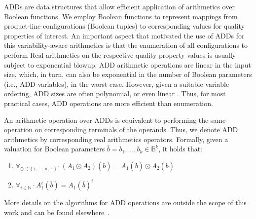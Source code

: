 ADDs are data structures that allow efficient application of arithmetics over Boolean functions.
We employ Boolean functions to represent mappings from product-line
configurations (Boolean tuples) to corresponding values for quality properties of interest.
An important aspect that motivated the use of ADDs for this
variability-aware arithmetics is that the enumeration of all configurations to perform Real
arithmetics on the respective quality property values is usually subject to exponential blowup.
ADD arithmetic operations are linear in the input size, which, in turn,
can also be exponential in the number of Boolean parameters (i.e., ADD variables), in the worst case.
However, given a suitable variable ordering, ADD sizes are often polynomial, or even linear \citep{ADD}.
Thus, for most practical cases, ADD operations are more efficient than enumeration.

An arithmetic operation over ADDs is equivalent to performing
the same operation on corresponding terminals of the operands.
Thus, we denote ADD arithmetics by corresponding real arithmetics operators.
Formally, given a valuation for Boolean parameters $\bar{b} = b_1,\dotsc,b_k \in \mathbb{B}^k$, it holds that:
\begin{enumerate}
    \item
        $\forall_{\odot \in \{+, -, \times, \div\}} \cdot {(A_1 \odot A_2)(\bar{b}) = A_1(\bar{b}) \odot A_2(\bar{b})}$
    \item
        $\forall_{i \in \mathbb{N}} \cdot {A_1^i(\bar{b}) = A_1(\bar{b})^i}$
\end{enumerate}

More details on the algorithms for ADD operations are outside the scope
of this work and can be found elsewhere~\citep{ADD}.
